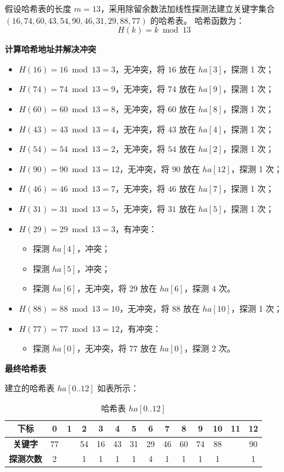 \documentclass[lang=cn,newtx,10pt,scheme=chinese]{elegantbook}
\begin{document}
假设哈希表的长度 $m = 13$，采用除留余数法加线性探测法建立关键字集合 $(16, 74, 60, 43, 54, 90, 46, 31, 29, 88, 77)$ 的哈希表。  
哈希函数为：
\[
H(k) = k \bmod 13
\]


\textbf{计算哈希地址并解决冲突}  

\begin{itemize}
  \item $H(16) = 16 \bmod 13 = 3$，无冲突，将 $16$ 放在 $ha[3]$，探测 1 次；
  \item $H(74) = 74 \bmod 13 = 9$，无冲突，将 $74$ 放在 $ha[9]$，探测 1 次；
  \item $H(60) = 60 \bmod 13 = 8$，无冲突，将 $60$ 放在 $ha[8]$，探测 1 次；
  \item $H(43) = 43 \bmod 13 = 4$，无冲突，将 $43$ 放在 $ha[4]$，探测 1 次；
  \item $H(54) = 54 \bmod 13 = 2$，无冲突，将 $54$ 放在 $ha[2]$，探测 1 次；
  \item $H(90) = 90 \bmod 13 = 12$，无冲突，将 $90$ 放在 $ha[12]$，探测 1 次；
  \item $H(46) = 46 \bmod 13 = 7$，无冲突，将 $46$ 放在 $ha[7]$，探测 1 次；
  \item $H(31) = 31 \bmod 13 = 5$，无冲突，将 $31$ 放在 $ha[5]$，探测 1 次；
  \item $H(29) = 29 \bmod 13 = 3$，有冲突：
    \begin{itemize}
      \item 探测 $ha[4]$，冲突；
      \item 探测 $ha[5]$，冲突；
      \item 探测 $ha[6]$，无冲突，将 $29$ 放在 $ha[6]$，探测 4 次。
    \end{itemize}
  \item $H(88) = 88 \bmod 13 = 10$，无冲突，将 $88$ 放在 $ha[10]$，探测 1 次；
  \item $H(77) = 77 \bmod 13 = 12$，有冲突：
    \begin{itemize}
      \item 探测 $ha[0]$，无冲突，将 $77$ 放在 $ha[0]$，探测 2 次。
    \end{itemize}
\end{itemize}


\textbf{最终哈希表}  

建立的哈希表 $ha[0..12]$ 如表所示：

\begin{table}[h!]
  \centering
  \caption{哈希表 $ha[0..12]$}
  \begin{tabular}{|c|c|c|c|c|c|c|c|c|c|c|c|c|c|}
  \hline
  \textbf{下标}     & 0  & 1  & 2  & 3  & 4  & 5  & 6  & 7  & 8  & 9  & 10 & 11 & 12 \\ \hline
  \textbf{关键字}   & 77 &    & 54 & 16 & 43 & 31 & 29 & 46 & 60 & 74 & 88 &    & 90 \\ \hline
  \textbf{探测次数} & 2  &    & 1  & 1  & 1  & 1  & 4  & 1  & 1  & 1  & 1  &    & 1  \\ \hline
  \end{tabular}
\end{table}
\end{document}
